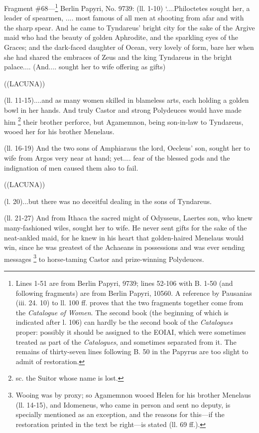 Fragment \#68—\footnote{Lines 1-51 are from Berlin
Papyri, 9739; lines 52-106 with B. 1-50 (and following fragments) are from
Berlin Papyri, 10560. A reference by Pausanias (iii. 24. 10) to ll. 100 ff.
proves that the two fragments together come from the \emph{Catalogue of
Women}. The second book (the beginning of which is indicated after l.
106) can hardly be the second book of the \emph{Catalogues} proper:
possibly it should be assigned to the EOIAI, which were sometimes treated as
part of the \emph{Catalogues}, and sometimes separated from it. The
remains of thirty-seven lines following B. 50 in the Papyrus are too slight to
admit of restoration.} Berlin Papyri, No. 9739: (ll.
1-10) ‘....Philoctetes sought her, a leader of spearmen, .... most famous
of all men at shooting from afar and with the sharp spear. And he came to
Tyndareus’ bright city for the sake of the Argive maid who had the beauty
of golden Aphrodite, and the sparkling eyes of the Graces; and the dark-faced
daughter of Ocean, very lovely of form, bare her when she had shared the
embraces of Zeus and the king Tyndareus in the bright palace.... (And....
sought her to wife offering as gifts)

((LACUNA))

(ll. 11-15)....and as many women skilled in blameless arts, each holding a
golden bowl in her hands. And truly Castor and strong Polydeuces would have
made him \footnote{sc. the Suitor whose name
is lost.} their brother perforce, but
Agamemnon, being son-in-law to Tyndareus, wooed her for his brother Menelaus.

(ll. 16-19) And the two sons of Amphiaraus the lord, Oecleus’ son, sought
her to wife from Argos very near at hand; yet.... fear of the blessed gods and
the indignation of men caused them also to fail.

((LACUNA))

(l. 20)...but there was no deceitful dealing in the sons of Tyndareus.

(ll. 21-27) And from Ithaca the sacred might of Odysseus, Laertes son, who knew
many-fashioned wiles, sought her to wife. He never sent gifts for the sake of
the neat-ankled maid, for he knew in his heart that golden-haired Menelaus
would win, since he was greatest of the Achaeans in possessions and was ever
sending messages \footnote{Wooing was by proxy; so
Agamemnon wooed Helen for his brother Menelaus (ll. 14-15), and Idomeneus, who
came in person and sent no deputy, is specially mentioned as an exception, and
the reasons for this—if the restoration printed in the text be
right—is stated (ll. 69 ff.).} to horse-taming Castor and
prize-winning Polydeuces.

